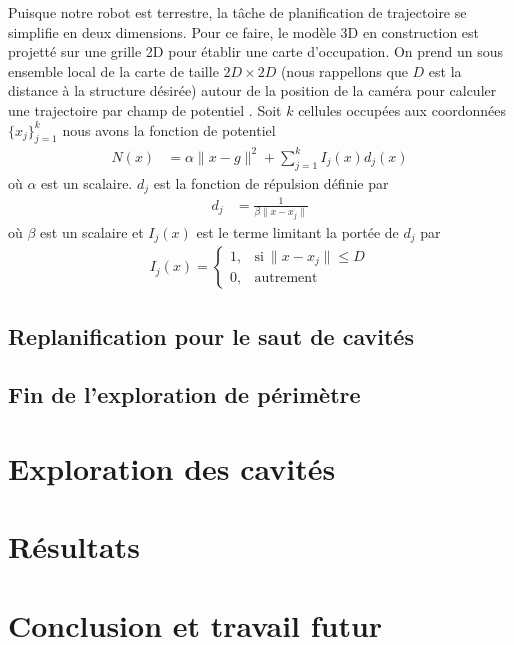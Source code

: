 Puisque notre robot est terrestre, la tâche de planification de trajectoire se simplifie en deux dimensions. Pour ce faire, le modèle 3D en construction est projetté sur une grille 2D pour établir une carte d'occupation. On prend un sous ensemble local de la carte de taille $2D \times 2D$ (nous rappellons que $D$ est la distance à la structure désirée) autour de la position de la caméra pour calculer une trajectoire par champ de potentiel \citep{Khatib1990, Choset2005}. Soit $k$ cellules occupées aux coordonnées $\{x_j\}^k_{j=1}$ nous avons la fonction de potentiel
\begin{align}
  N(x) &= \alpha \| x - g \|^2 + \sum^k_{j=1} I_j(x)d_j(x)
\end{align}
où $\alpha$ est un scalaire. $d_j$ est la fonction de répulsion définie par
\begin{align}
  d_j &= \frac{1}{\beta \| x - x_j \|}
\end{align}
où $\beta$ est un scalaire et $I_j(x)$ est le terme limitant la portée de $d_j$ par
\begin{align}
  I_j(x) =     \begin{cases}
      1, & \text{si}\ \|x - x_j\| \leq D \\
      0, & \text{autrement}
    \end{cases}
\end{align}

\subsection{Replanification pour le saut de cavités}

\subsection{Fin de l'exploration de périmètre}

\section{Exploration des cavités} \label{sec:cavity_exploration}

\section{Résultats} \label{sec:ugv_results}

\section{Conclusion et travail futur}

